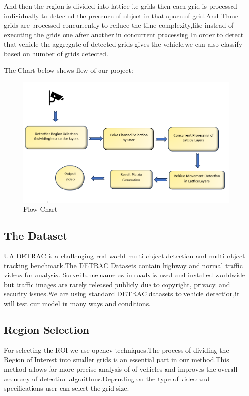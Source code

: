 \documentclass[conference]{IEEEtran}
\begin{document}
And then the region is divided into lattice i.e grids then each grid is processed individually to detected the presence of object in that space of grid.And These grids are processed concurrently to reduce the time complexity,like instead of executing the grids one after another in concurrent processing  In order to detect that vehicle the aggregate of detected grids gives the vehicle.we can also classify based on number of grids detected.

The Chart below shows flow of our project:

\begin{figure}[h]
    \centering
    \includegraphics[width=0.9\linewidth]{flowchart.png}
    \caption{Flow Chart}
    \label{fig:enter-label}
\end{figure}


\subsection{The Dataset}\label{AA}
UA-DETRAC is a challenging real-world multi-object detection and multi-object tracking benchmark.The DETRAC Datasets contain highway and normal traffic videos for analysis. 
Surveillance cameras in roads is used and installed worldwide but traffic images are rarely released publicly due to copyright, privacy, and security issues.We are using standard DETRAC datasets to vehicle detection,it will test our model in many ways and conditions.


\subsection{Region Selection}\label{AA}
For selecting the ROI we use opencv techniques.The process of dividing the Region of Interest into smaller grids is an essential part in our method.This method allows for more precise analysis of of vehicles and improves the overall accuracy of detection algorithms.Depending on the type of video and specifications user can select the grid size.
\end{document}
